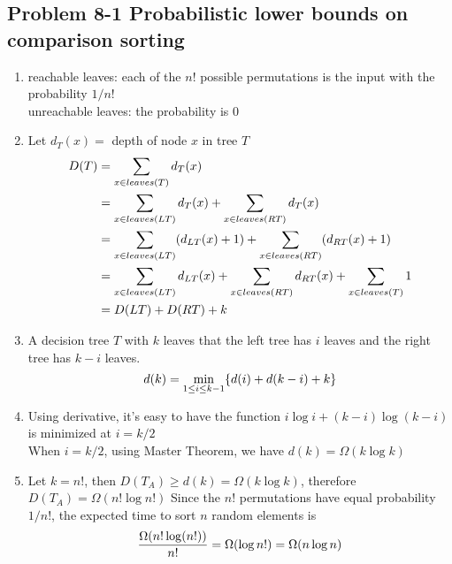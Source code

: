 \subsection*{Problem 8-1 Probabilistic lower bounds on comparison sorting}
\begin{enumerate}
	\item	reachable leaves: each of the $n!$ possible permutations is the input with the probability $1 / n!$ \\
		unreachable leaves: the probability is $0$
	\item	Let $d_T(x) =$ depth of node $x$ in tree $T$
		\begin{equation} \notag
		\begin{aligned}
			D(T) & = \sum_{x \in leaves(T)} d_T(x) \\ 
			& = \sum_{x \in leaves(LT)} d_T(x) + \sum_{x \in leaves(RT)} d_T(x) \\
			& = \sum_{x \in leaves(LT)} (d_{LT}(x) + 1) + \sum_{x \in leaves(RT)} (d_{RT}(x) + 1) \\
			& = \sum_{x \in leaves(LT)} d_{LT}(x) + \sum_{x \in leaves(RT)} d_{RT}(x) + \sum_{x \in leaves(T)} 1 \\
			& = D(LT) + D(RT) + k
		\end{aligned}
		\end{equation}
	\item	A decision tree $T$ with $k$ leaves that the left tree has $i$ leaves and the right tree has $k - i$ leaves.
		\begin{equation} \notag
			d(k) = \min_{1 \leq i \leq k - 1} \{ d(i) + d(k - i) + k \}
		\end{equation}
	\item	Using derivative, it's easy to have the function $i \log i + (k - i) \log (k - i)$ is minimized at $i = k / 2$ \\
		When $i = k / 2$, using Master Theorem, we have $d(k) = \Omega(k \log k)$
	\item	Let $k = n!$, then $D(T_A) \geq d(k) = \Omega(k \log k)$, therefore $D(T_A) = \Omega(n! \log n!)$
		Since the $n!$ permutations have equal probability $1 / n!$, the expected time to sort $n$ random elements is
		\begin{equation} \notag
			\frac{\Omega(n! \log (n!))}{n!} = \Omega(\log n!) = \Omega(n \log n)
		\end{equation}
\end{enumerate}

